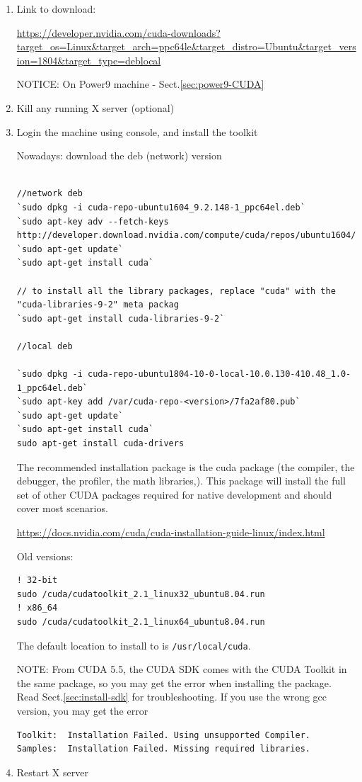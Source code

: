 \begin{enumerate}

   \item Link to download:

\url{https://developer.nvidia.com/cuda-downloads?target_os=Linux&target_arch=ppc64le&target_distro=Ubuntu&target_version=1804&target_type=deblocal}

NOTICE: On Power9 machine - Sect.\ref{sec:power9-CUDA}

\item Kill any running X server (optional)

\item Login the machine using console, and install the toolkit


Nowadays: download the deb (network) version
\begin{verbatim}

//network deb
`sudo dpkg -i cuda-repo-ubuntu1604_9.2.148-1_ppc64el.deb`
`sudo apt-key adv --fetch-keys http://developer.download.nvidia.com/compute/cuda/repos/ubuntu1604/ppc64el/7fa2af80.pub`
`sudo apt-get update`
`sudo apt-get install cuda`

// to install all the library packages, replace "cuda" with the "cuda-libraries-9-2" meta packag
`sudo apt-get install cuda-libraries-9-2`

//local deb

`sudo dpkg -i cuda-repo-ubuntu1804-10-0-local-10.0.130-410.48_1.0-1_ppc64el.deb`
`sudo apt-key add /var/cuda-repo-<version>/7fa2af80.pub`
`sudo apt-get update`
`sudo apt-get install cuda`
sudo apt-get install cuda-drivers
\end{verbatim}


The recommended installation package is the cuda package (the compiler, the
debugger, the profiler, the math libraries,). This package will install the full
set of other CUDA packages required for native development and should cover most
scenarios.

\url{https://docs.nvidia.com/cuda/cuda-installation-guide-linux/index.html}


Old versions:
\begin{verbatim}
! 32-bit
sudo /cuda/cudatoolkit_2.1_linux32_ubuntu8.04.run
! x86_64
sudo /cuda/cudatoolkit_2.1_linux64_ubuntu8.04.run
\end{verbatim}
 The default location to install to is \verb!/usr/local/cuda!.

NOTE: From CUDA 5.5, the CUDA SDK comes with the CUDA Toolkit in the same
package, so you may get the error when installing the package. Read
Sect.\ref{sec:install-sdk} for troubleshooting. If you use the wrong gcc
version, you may get the error
\begin{verbatim}
Toolkit:  Installation Failed. Using unsupported Compiler.
Samples:  Installation Failed. Missing required libraries.
\end{verbatim}


\item Restart X server
\end{enumerate}

